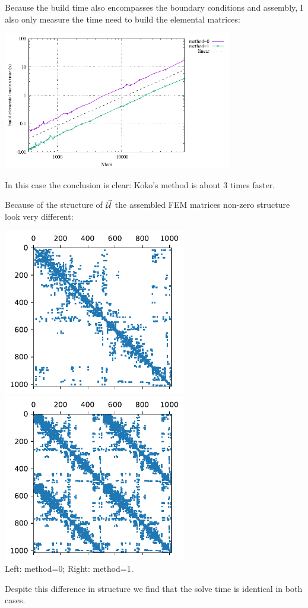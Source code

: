 Because the build time also encompasses the boundary conditions and 
assembly, I also only measure the time need to build the elemental matrices:
\begin{center}
\includegraphics[width=10cm]{python_codes/fieldstone_179/RESULTS/Ael.pdf}
\end{center}
In this case the conclusion is clear: Koko's method is about 3 times faster.

Because of the structure of $\vec{\cal U}$ the assembled FEM matrices 
non-zero structure look very different:
\begin{center}
\includegraphics[width=8cm]{python_codes/fieldstone_179/RESULTS/matrix0.pdf}
\includegraphics[width=8cm]{python_codes/fieldstone_179/RESULTS/matrix1.pdf}\\
{\captionfont Left: method=0; Right: method=1.}
\end{center}
Despite this difference in structure we find that the solve time is identical
in both cases.

